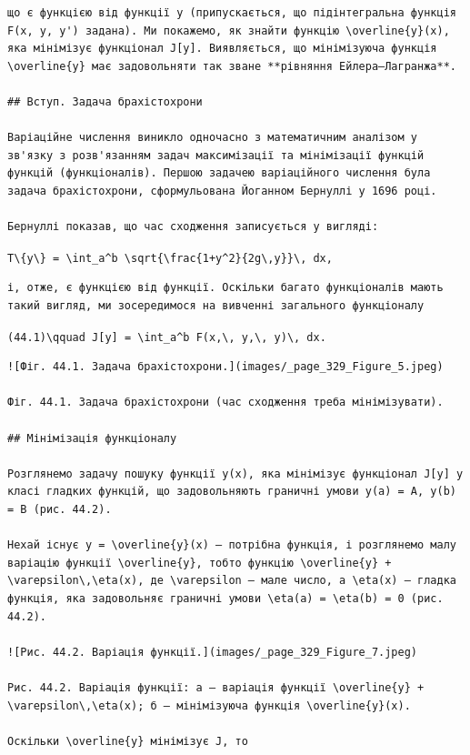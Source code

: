 \documentclass[
  ukrainian,
]{article}
\begin{document}
\begin{verbatim}
що є функцією від функції y (припускається, що підінтегральна функція F(x, y, y') задана). Ми покажемо, як знайти функцію \overline{y}(x), яка мінімізує функціонал J[y]. Виявляється, що мінімізуюча функція \overline{y} має задовольняти так зване **рівняння Ейлера–Лагранжа**.

## Вступ. Задача брахістохрони

Варіаційне числення виникло одночасно з математичним аналізом у зв'язку з розв'язанням задач максимізації та мінімізації функцій функцій (функціоналів). Першою задачею варіаційного числення була задача брахістохрони, сформульована Йоганном Бернуллі у 1696 році.

Бернуллі показав, що час сходження записується у вигляді:
\end{verbatim}

\texttt{T\textbackslash{}\{y\textbackslash{}\}\ =\ \textbackslash{}int\_a\^{}b\ \textbackslash{}sqrt\{\textbackslash{}frac\{1+y\textquotesingle{}\^{}2\}\{2g\textbackslash{},y\}\}\textbackslash{},\ dx,}

\begin{verbatim}
і, отже, є функцією від функції. Оскільки багато функціоналів мають такий вигляд, ми зосередимося на вивченні загального функціоналу
\end{verbatim}

\texttt{(44.1)\textbackslash{}qquad\ J{[}y{]}\ =\ \textbackslash{}int\_a\^{}b\ F(x,\textbackslash{},\ y,\textbackslash{},\ y\textquotesingle{})\textbackslash{},\ dx.}

\begin{verbatim}
![Фіг. 44.1. Задача брахістохрони.](images/_page_329_Figure_5.jpeg)

Фіг. 44.1. Задача брахістохрони (час сходження треба мінімізувати).

## Мінімізація функціоналу

Розглянемо задачу пошуку функції y(x), яка мінімізує функціонал J[y] у класі гладких функцій, що задовольняють граничні умови y(a) = A, y(b) = B (рис. 44.2).

Нехай існує y = \overline{y}(x) — потрібна функція, і розглянемо малу варіацію функції \overline{y}, тобто функцію \overline{y} + \varepsilon\,\eta(x), де \varepsilon — мале число, а \eta(x) — гладка функція, яка задовольняє граничні умови \eta(a) = \eta(b) = 0 (рис. 44.2).

![Рис. 44.2. Варіація функції.](images/_page_329_Figure_7.jpeg)

Рис. 44.2. Варіація функції: а — варіація функції \overline{y} + \varepsilon\,\eta(x); б — мінімізуюча функція \overline{y}(x).

Оскільки \overline{y} мінімізує J, то
\end{verbatim}
\end{document}
